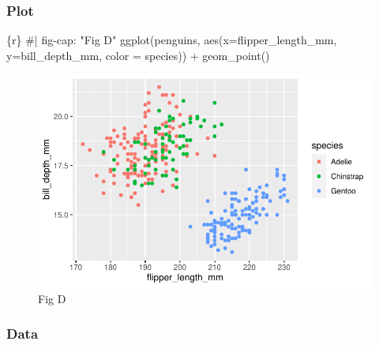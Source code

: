 \documentclass[
  letterpaper,
  DIV=11,
  numbers=noendperiod]{scrreprt}
\newenvironment{Shaded}{\begin{snugshade}}{\end{snugshade}}
\newcommand{\AttributeTok}[1]{\textcolor[rgb]{0.40,0.45,0.13}{#1}}
\newcommand{\CommentTok}[1]{\textcolor[rgb]{0.37,0.37,0.37}{#1}}
\newcommand{\FunctionTok}[1]{\textcolor[rgb]{0.28,0.35,0.67}{#1}}
\newcommand{\InformationTok}[1]{\textcolor[rgb]{0.37,0.37,0.37}{#1}}
\newcommand{\NormalTok}[1]{\textcolor[rgb]{0.00,0.23,0.31}{#1}}
\newcommand{\SpecialCharTok}[1]{\textcolor[rgb]{0.37,0.37,0.37}{#1}}
\begin{document}
\begin{tcolorbox}[enhanced jigsaw, colframe=quarto-callout-note-color-frame, breakable, colback=white, toprule=.15mm, leftrule=.75mm, left=2mm, opacityback=0, rightrule=.15mm, arc=.35mm, bottomrule=.15mm]

\hypertarget{plot-2}{%
\subsubsection*{Plot}\label{plot-2}}

\begin{Shaded}
\begin{Highlighting}[]
\InformationTok{\textasciigrave{}\textasciigrave{}\textasciigrave{}\{r\}}
\CommentTok{\#| fig{-}cap: "Fig D"}
\FunctionTok{ggplot}\NormalTok{(penguins, }\FunctionTok{aes}\NormalTok{(}\AttributeTok{x=}\NormalTok{flipper\_length\_mm, }\AttributeTok{y=}\NormalTok{bill\_depth\_mm, }\AttributeTok{color =}\NormalTok{ species)) }\SpecialCharTok{+}
  \FunctionTok{geom\_point}\NormalTok{()}
\InformationTok{\textasciigrave{}\textasciigrave{}\textasciigrave{}}
\end{Highlighting}
\end{Shaded}

\begin{figure}[H]

{\centering \includegraphics{03-content_files/figure-pdf/unnamed-chunk-10-1.pdf}

}

\caption{Fig D}

\end{figure}

\hypertarget{data-2}{%
\subsubsection*{Data}\label{data-2}}


\end{tcolorbox}
\end{document}
